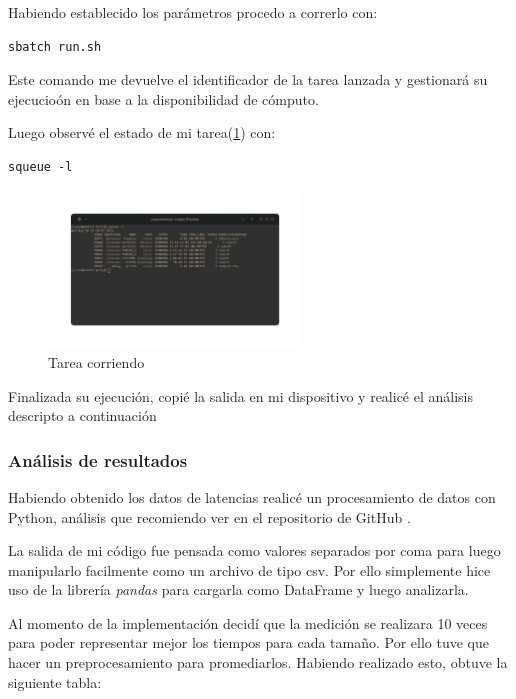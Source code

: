 Habiendo establecido los parámetros procedo a correrlo con:

\begin{lstlisting}
sbatch run.sh
\end{lstlisting}

Este comando me devuelve el identificador de la tarea lanzada y gestionará su ejecucioón en base a la disponibilidad de cómputo.

Luego observé el estado de mi tarea(\ref{fig:squeue}) con:
\begin{lstlisting}
squeue -l
\end{lstlisting}

\begin{figure}[H]
    \centering
    \includegraphics[width=0.60\textwidth]{Images/ej1/Captura desde 2023-08-30 14-20-39.png}
    \caption{Tarea corriendo}
    \label{fig:squeue}
\end{figure}

Finalizada su ejecución, copié la salida en mi dispositivo y realicé el análisis descripto a continuación

\subsubsection{Análisis de resultados}
Habiendo obtenido los datos de latencias realicé un procesamiento de datos con Python, análisis que recomiendo ver en el repositorio de GitHub \cite{justog220_practica-car_2023}.

La salida de mi código fue pensada como valores separados por coma para luego manipularlo facilmente como un archivo de tipo csv. Por ello simplemente hice uso de la librería \textit{pandas} para cargarla como DataFrame y luego analizarla. 

Al momento de la implementación decidí que la medición se realizara 10 veces para poder representar mejor los tiempos para cada tamaño. Por ello tuve que hacer un preprocesamiento para promediarlos. Habiendo realizado esto, obtuve la siguiente tabla:

